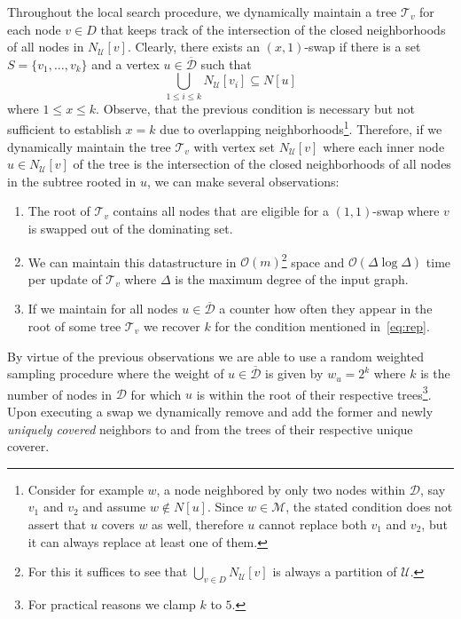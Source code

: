 \documentclass[a4paper, USenglish, cleveref, autoref, thm-restate, noalgorithm2e]{socg-lipics-v2021}
\def\Oh#1{\ensuremath{\mathcal O\!\left(#1\right)}}
\newcommand{\domset}{\ensuremath{\mathcal D}\xspace}
\newcommand{\uniquelycovered}{\ensuremath{\mathcal U}\xspace}
\newcommand{\multicovered}{\ensuremath{\mathcal M}\xspace}
\newcommand{\intersectiontree}{\ensuremath{\mathcal T}\xspace}
\newcommand{\cdomset}{\ensuremath{\overline{\mathcal D}}\xspace}
\begin{document}
Throughout the local search procedure, we dynamically maintain a tree $\intersectiontree_v$ for each node $v \in D$ that keeps track of the intersection of the closed neighborhoods of all nodes in $N_{\uniquelycovered}[v]$.
%
Clearly, there exists an $(x,1)$-swap if there is a set $S = \{v_1,\ldots,v_k\}$ and a vertex $u \in \cdomset$ such that
\begin{equation}\label{eq:rep}
    \bigcup_{1\leq i \leq k}N_{\uniquelycovered}[v_i] \subseteq N[u]
\end{equation}
where $1 \leq x\leq k$.
%
Observe, that the previous condition is necessary but not sufficient to establish $x=k$ due to overlapping neighborhoods\footnote{Consider for example $w$, a node neighbored by only two nodes within $\domset$, say $v_1$ and $v_2$ and assume $w\notin N[u]$. Since $w\in\multicovered$, the stated condition does not assert that $u$ covers $w$ as well, therefore $u$ cannot replace both $v_1$ and $v_2$, but it can always replace at least one of them.}.
%
Therefore, if we dynamically maintain the tree $\intersectiontree_v$ with vertex set $N_{\uniquelycovered}[v]$ where each inner node $u \in N_{\uniquelycovered}[v]$ of the tree is the intersection of the closed neighborhoods of all nodes in the subtree rooted in $u$, we can make several observations:
\begin{enumerate}
    \item The root of $\intersectiontree_v$ contains all nodes that are eligible for a $(1,1)$-swap where $v$ is swapped out of the dominating set.
    \item We can maintain this datastructure in $\Oh m$\footnote{For this it suffices to see that $\bigcup_{v\in D} N_{\uniquelycovered}[v]$ is always a partition of $\uniquelycovered$.} space and $\Oh{\Delta\log\Delta}$ time per update of $\intersectiontree_v$ where $\Delta$ is the maximum degree of the input graph.
    \item If we maintain for all nodes $u \in \cdomset$ a counter how often they appear in the root of some tree $\intersectiontree_v$ we recover $k$ for the condition mentioned in~\cref{eq:rep}.
\end{enumerate}
By virtue of the previous observations we are able to use a random weighted sampling procedure where the weight of $u \in \cdomset$ is given by $w_u = 2^{k}$ where $k$ is the number of nodes in $\domset$ for which $u$ is within the root of their respective trees\footnote{For practical reasons we clamp $k$ to $5$.}.
%
Upon executing a swap we dynamically remove and add the former and newly \textit{uniquely covered} neighbors to and from the trees of their respective unique coverer.
\end{document}
